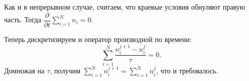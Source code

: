 \documentclass[12pt, a5paper, fleqn, twoside]{article}
\theoremstyle{definiton}
\theoremstyle{definition}
\begin{document}
Как и в непрерывном случае, считаем, что краевые условия обнуляют правую часть. Тогда $\dfrac{\partial}{\partial t} \displaystyle\sum_{i=1}^{N} n_i =0$.

Теперь дискретизируем и оператор производной по времени: $$\displaystyle\sum_{i=1}^{N} \dfrac{n_i^{j+1}-n_i^j}{\tau}=0.$$ Домножая на $\tau$, получим $\displaystyle\sum_{i=1}^{N} n_i^{j+1}=\displaystyle\sum_{i=1}^{N} n_i^j$, что и требовалось.

\end{document}
